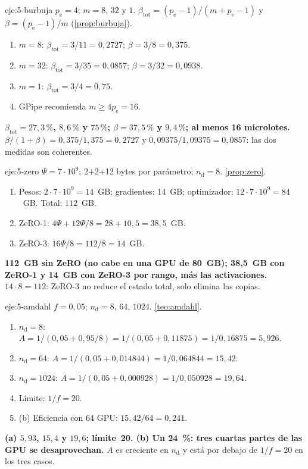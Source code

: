 \begin{solucion}{eje:5-burbuja}
\datos $p_{\mathrm{e}}=4$; $m=8$, $32$ y $1$.
\planteamiento $\beta_{\mathrm{tot}}=(p_{\mathrm{e}}-1)/(m+p_{\mathrm{e}}-1)$ y $\beta=(p_{\mathrm{e}}-1)/m$ (\cref{prop:burbuja}).
\pasos
\begin{enumerate}[label=\arabic*.]
  \item $m=8$: $\beta_{\mathrm{tot}}=3/11=0{,}2727$; $\beta=3/8=0{,}375$.
  \item $m=32$: $\beta_{\mathrm{tot}}=3/35=0{,}0857$; $\beta=3/32=0{,}0938$.
  \item $m=1$: $\beta_{\mathrm{tot}}=3/4=0{,}75$.
  \item GPipe recomienda $m\ge 4p_{\mathrm{e}}=16$.
\end{enumerate}
\resultado \textbf{$\beta_{\mathrm{tot}}=27{,}3\,\%$, $8{,}6\,\%$ y $75\,\%$; $\beta=37{,}5\,\%$ y $9{,}4\,\%$; al menos 16 microlotes.}
\comprobacion $\beta/(1+\beta)=0{,}375/1{,}375=0{,}2727$ y $0{,}09375/1{,}09375=0{,}0857$: las dos medidas son coherentes.
\end{solucion}

\begin{solucion}{eje:5-zero}
\datos $\Psi=7\cdot 10^{9}$; 2+2+12 bytes por parámetro; $n_{\mathrm{d}}=8$.
\planteamiento \cref{prop:zero}.
\pasos
\begin{enumerate}[label=\arabic*.]
  \item Pesos: $2\cdot 7\cdot 10^{9}=14$~GB; gradientes: 14~GB; optimizador: $12\cdot 7\cdot 10^{9}=84$~GB. Total: $112$~GB.
  \item ZeRO-1: $4\Psi+12\Psi/8=28+10{,}5=38{,}5$~GB.
  \item ZeRO-3: $16\Psi/8=112/8=14$~GB.
\end{enumerate}
\resultado \textbf{112~GB sin ZeRO (no cabe en una GPU de 80~GB); 38{,}5~GB con ZeRO-1 y 14~GB con ZeRO-3 por rango, más las activaciones.}
\comprobacion $14\cdot 8=112$: ZeRO-3 no reduce el estado total, solo elimina las copias.
\end{solucion}

\begin{solucion}{eje:5-amdahl}
\datos $f=0{,}05$; $n_{\mathrm{d}}=8$, $64$, $1024$.
\planteamiento \cref{teo:amdahl}.
\pasos
\begin{enumerate}[label=\arabic*.]
  \item $n_{\mathrm{d}}=8$: $A=1/(0{,}05+0{,}95/8)=1/(0{,}05+0{,}11875)=1/0{,}16875=5{,}926$.
  \item $n_{\mathrm{d}}=64$: $A=1/(0{,}05+0{,}014844)=1/0{,}064844=15{,}42$.
  \item $n_{\mathrm{d}}=1024$: $A=1/(0{,}05+0{,}000928)=1/0{,}050928=19{,}64$.
  \item Límite: $1/f=20$.
  \item (b) Eficiencia con 64 GPU: $15{,}42/64=0{,}241$.
\end{enumerate}
\resultado \textbf{(a) $5{,}93$, $15{,}4$ y $19{,}6$; límite~20. (b) Un 24~\%: tres cuartas partes de las GPU se desaprovechan.}
\comprobacion $A$ es creciente en $n_{\mathrm{d}}$ y está por debajo de $1/f=20$ en los tres casos.
\end{solucion}


